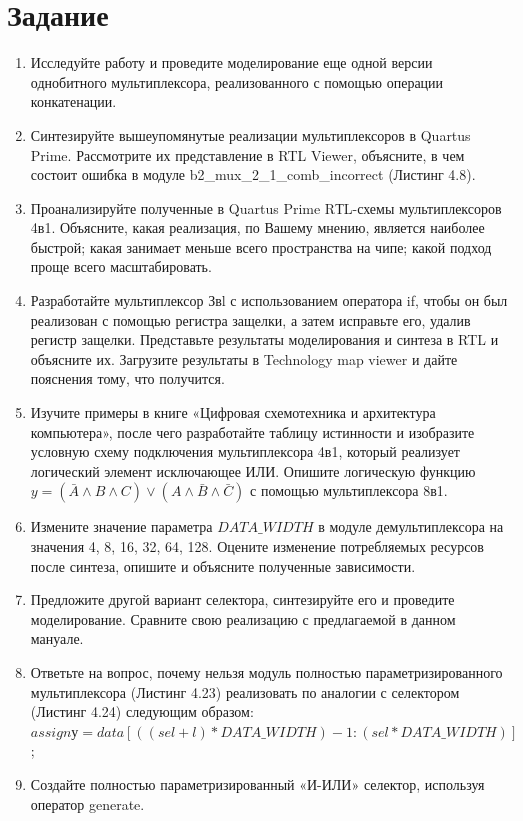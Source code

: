 \documentclass[a4paper,14pt]{article}
\begin{document}

\tableofcontents
\pagebreak
\section{Задание}

\begin{enumerate}
	\item Исследуйте работу и проведите моделирование еще одной версии однобитного
	мультиплексора, реализованного с помощью операции конкатенации.
	
	\item Синтезируйте вышеупомянутые реализации мультиплексоров в Quartus Prime. Рассмотрите
	их представление в RTL Viewer, объясните, в чем состоит ошибка в модуле
	b2\_mux\_2\_1\_comb\_incorrect (Листинг 4.8).
	
	\item Проанализируйте полученные в Quartus Prime RТL-схемы мультиплексоров 4в1. Объясните,	какая реализация, по Вашему мнению, является наиболее быстрой; какая занимает меньше всего пространства на чипе; какой подход проще всего масштабировать.
	
	\item Разработайте мультиплексор Звl с использованием оператора if, чтобы он был реализован с	помощью регистра защелки, а затем исправьте его, удалив регистр защелки. Представьте	результаты моделирования и синтеза в RTL и объясните их. Загрузите результаты в Technology map viewer и дайте пояснения тому, что получится.
	
	\item Изучите примеры в книге «Цифровая схемотехника и архитектура компьютера», после чего	разработайте таблицу истинности и изобразите условную схему подключения мультиплексора 4в1, который реализует логический элемент исключающее ИЛИ. Опишите	логическую функцию $y = (\bar A \wedge B \wedge C) \vee (A \wedge \bar B \wedge \bar C)$ с помощью мультиплексора 8в1.
	
	\item Измените значение параметра $DATA\_WIDTH$ в модуле демультиплексора на значения 4, 8, 16, 32, 64, 128. Оцените изменение потребляемых ресурсов после синтеза, опишите и объясните полученные зависимости.
	
	\item Предложите другой вариант селектора, синтезируйте его и проведите моделирование. Сравните свою реализацию с предлагаемой в данном мануале.
	
	\item Ответьте на вопрос, почему нельзя модуль полностью параметризированного мультиплексора (Листинг 4.23) реализовать по аналогии с селектором (Листинг 4.24) следующим образом: $assign у= data[((sel+l)*DATA\_WIDTH) - 1: (sel*DATA\_WIDTH)]$;
	
	\item Создайте полностью параметризированный «И-ИЛИ» селектор, используя оператор generate.
	
\end{enumerate}
\end{document}
